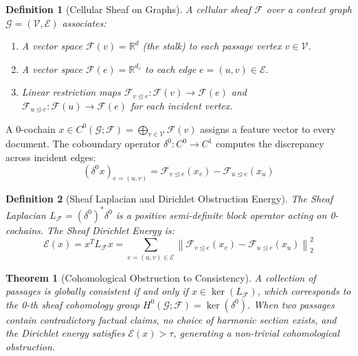 \documentclass[11pt,a4paper]{article}
\newtheorem{theorem}{Theorem}
\newtheorem{definition}{Definition}
\begin{document}
\begin{definition}[Cellular Sheaf on Graphs]
A cellular sheaf $\mathcal{F}$ over a context graph $\mathcal{G} = (\mathcal{V}, \mathcal{E})$ associates:
\begin{enumerate}
    \item A vector space $\mathcal{F}(v) = \mathbb{R}^d$ (the stalk) to each passage vertex $v \in \mathcal{V}$.
    \item A vector space $\mathcal{F}(e) = \mathbb{R}^{d_e}$ to each edge $e = (u, v) \in \mathcal{E}$.
    \item Linear restriction maps $\mathcal{F}_{v \unlhd e}: \mathcal{F}(v) \to \mathcal{F}(e)$ and $\mathcal{F}_{u \unlhd e}: \mathcal{F}(u) \to \mathcal{F}(e)$ for each incident vertex.
\end{enumerate}
\end{definition}

A 0-cochain $x \in C^0(\mathcal{G}; \mathcal{F}) = \bigoplus_{v \in \mathcal{V}} \mathcal{F}(v)$ assigns a feature vector to every document. The coboundary operator $\delta^0: C^0 \to C^1$ computes the discrepancy across incident edges:
\begin{equation}
    (\delta^0 x)_{e=(u, v)} = \mathcal{F}_{v \unlhd e}(x_v) - \mathcal{F}_{u \unlhd e}(x_u)
\end{equation}

\begin{definition}[Sheaf Laplacian and Dirichlet Obstruction Energy]
The Sheaf Laplacian $L_{\mathcal{F}} = (\delta^0)^* \delta^0$ is a positive semi-definite block operator acting on 0-cochains. The Sheaf Dirichlet Energy is:
\begin{equation}
    \mathcal{E}(x) = x^T L_{\mathcal{F}} x = \sum_{e=(u, v) \in \mathcal{E}} \left\| \mathcal{F}_{v \unlhd e}(x_v) - \mathcal{F}_{u \unlhd e}(x_u) \right\|_2^2
\end{equation}
\end{definition}

\begin{theorem}[Cohomological Obstruction to Consistency]
A collection of passages is globally consistent if and only if $x \in \ker(L_{\mathcal{F}})$, which corresponds to the 0-th sheaf cohomology group $H^0(\mathcal{G}; \mathcal{F}) = \ker(\delta^0)$. When two passages contain contradictory factual claims, no choice of harmonic section exists, and the Dirichlet energy satisfies $\mathcal{E}(x) > \tau$, generating a non-trivial cohomological obstruction.
\end{theorem}
\end{document}
